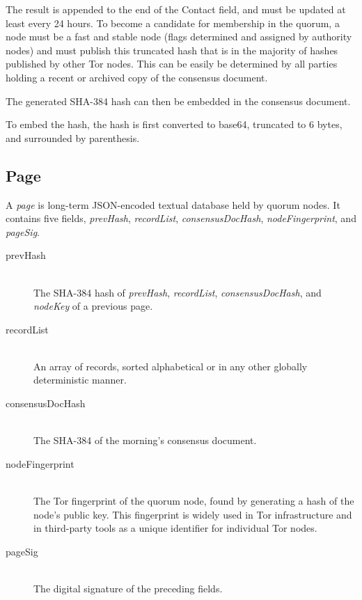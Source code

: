 The result is appended to the end of the Contact field, and must be updated at least every 24 hours. To become a candidate for membership in the quorum, a node must be a fast and stable node (flags determined and assigned by authority nodes) and must publish this truncated hash that is in the majority of hashes published by other Tor nodes. This can be easily be determined by all parties holding a recent or archived copy of the consensus document.




The generated SHA-384 hash can then be embedded in the consensus document. 

 To embed the hash, the hash is first converted to base64, truncated to 6 bytes, and surrounded by parenthesis. 

\subsection{Page}

A \emph{page} is long-term JSON-encoded textual database held by quorum nodes. It contains five fields, \emph{prevHash}, \emph{recordList}, \emph{consensusDocHash}, \emph{nodeFingerprint}, and \emph{pageSig}. 

\begin{description}
	\item[prevHash] \hfill \\
		The SHA-384 hash of \emph{prevHash}, \emph{recordList}, \emph{consensusDocHash}, and \emph{nodeKey} of a previous page.
	\item[recordList] \hfill \\
		An array of records, sorted alphabetical or in any other globally deterministic manner.
	\item[consensusDocHash] \hfill \\
		The SHA-384 of the morning's consensus document.
	\item[nodeFingerprint] \hfill \\
		The Tor fingerprint of the quorum node, found by generating a hash of the node's public key. This fingerprint is widely used in Tor infrastructure and in third-party tools as a unique identifier for individual Tor nodes.
	\item[pageSig] \hfill \\
		The digital signature of the preceding fields.
\end{description}

